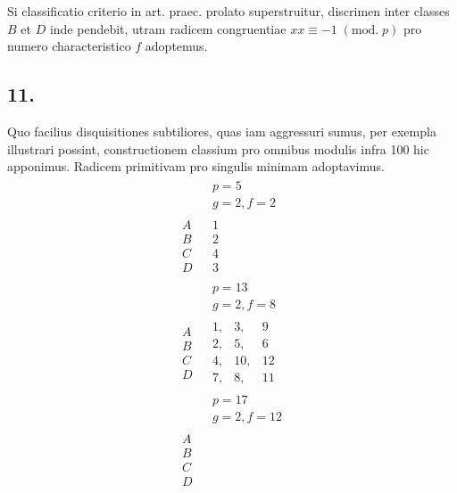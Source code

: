 \documentclass[twoside,12pt, showframe]{memoir}
\renewcommand{\pmod}[1]{\;(\textrm{mod.}\;#1)}
\begin{document}
Si classificatio criterio in art. praec. prolato superstruitur, discrimen inter classes \(B\) et \(D\) inde pendebit, utram radicem congruentiae \(x x \equiv-1\pmod{p}\) pro numero characteristico \(f\) adoptemus.

\subsection*{11.}
 
Quo facilius disquisitiones subtiliores, quas iam aggressuri sumus, per exempla illustrari possint, constructionem classium pro omnibus modulis infra 100 hic apponimus. Radicem primitivam pro singulis minimam adoptavimus.
\[\begin{aligned}
& \begin{array}{c} p=5 \\  g=2, f=2 \end{array} \\
\begin{array}{l} A \\ B \\ C \\D \end{array} & \begin{array}{|r} 1 \\ 2 \\ 4 \\ 3 \end{array} \\
& \begin{array}{c} p=13 \\  g=2, f=8 \end{array} \\ 
\begin{array}{l} A \\ B \\ C \\D \end{array} & \begin{array}{|rrr} 1,& 3,& 9 \\ 2,& 5,&6 \\ 4,& 10,& 12 \\ 7,& 8,& 11 \end{array}\\
& \begin{array}{c} p=17 \\  g=2, f=12 \end{array} \\
\begin{array}{l} A \\ B \\ C \\D \end{array} & 

\end{aligned}\]
\end{document}
